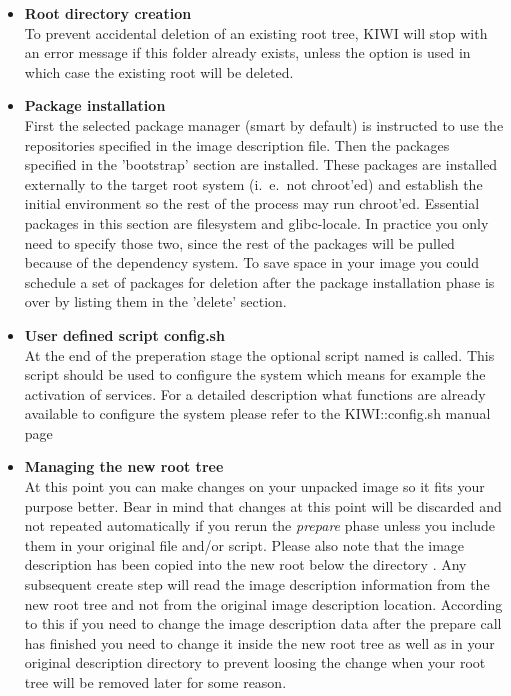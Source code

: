 \begin{itemize}
\item \textbf{Root directory creation}\\
      To prevent accidental deletion of an existing root tree, KIWI will
      stop with an error message if this folder already exists, unless the
      option  is used in which case the existing root will
      be deleted.
\item \textbf{Package installation}\\
      First the selected package manager (smart by default) is instructed to
      use the repositories specified in the image description file.
      Then the packages specified in the 'bootstrap' section are installed.
      These packages are installed externally to the target root system
      (i.~e.\ not chroot'ed) and establish the initial environment so the rest
      of  the process may run chroot'ed. Essential packages in this section
      are filesystem and glibc-locale. In practice you only need to
      specify those two, since the rest of the packages will be pulled
      because of the dependency system. To save space in your image you
      could schedule a set of packages for deletion after the package
      installation phase is over by listing them in the 'delete' section.
\item \textbf{User defined script config.sh}\\
      At the end of the preperation stage the optional script named 
      is called. This script should be used to configure the system which means
      for example the activation of services. For a detailed description what
      functions are already available to configure the system please refer to
      the KIWI::config.sh manual page
\item \textbf{Managing the new root tree}\\
      At this point you can make changes on your unpacked image so it fits
      your purpose better. Bear in mind that changes at this point will be
      discarded and not repeated automatically if you rerun the \emph{prepare}
      phase unless you include them in your original  file and/or
       script. Please also note that the image description has
      been copied into the new root below the directory
      . Any subsequent create step will read
      the image description information from the new root tree and not
      from the original image description location. According to this
      if you need to change the image description data
      after the prepare call has finished you need to change it inside the
      new root tree as well as in your original description directory to
      prevent loosing the change when your root tree will be removed later
      for some reason.
\end{itemize}

